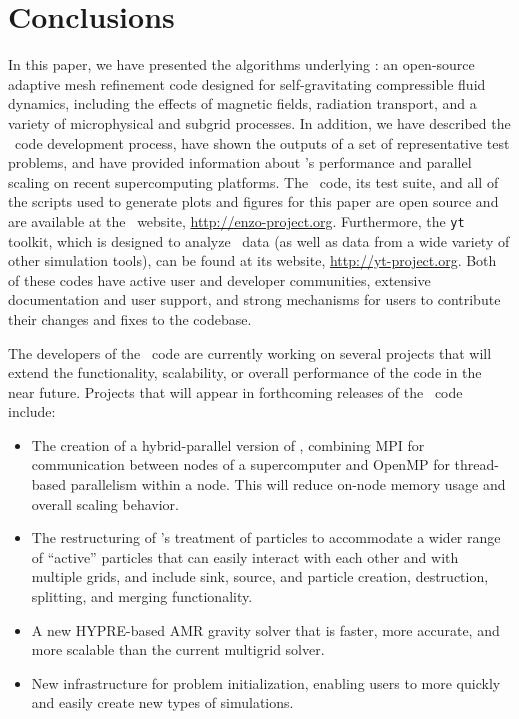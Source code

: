 
\section{Conclusions}
\label{sec.conclusions}

In this paper, we have presented the algorithms underlying \enzo: an
open-source adaptive mesh refinement code designed for
self-gravitating compressible fluid dynamics, including the effects of
magnetic fields, radiation transport, and a variety of microphysical
and subgrid processes.  In addition, we have described the \enzo\ code
development process, have shown the outputs of a set of representative
test problems, and have provided information about \enzo's performance
and parallel scaling on recent supercomputing platforms.  The \enzo\
code, its test suite, and all of the scripts used to generate plots
and figures for this paper are open source and are available at the
\enzo\ website, \url{http://enzo-project.org}.  Furthermore, the \texttt{yt} toolkit,
which is designed to analyze \enzo\ data (as well as data from a wide
variety of other simulation tools), can be found at its website,
\url{http://yt-project.org}.  Both of these codes have active user and
developer communities, extensive documentation and user support, and
strong mechanisms for users to contribute their changes and fixes to
the codebase.

The developers of the \enzo\ code are currently working on several
projects that will extend the functionality, scalability, or overall
performance of the code in the near future.  Projects that will appear
in forthcoming releases of the \enzo\ code include:

\begin{itemize}
\item The creation of a hybrid-parallel version of \enzo, combining
MPI for communication between nodes of a supercomputer and OpenMP for
thread-based parallelism within a node.  This will reduce on-node
memory usage and overall scaling behavior.
\item The restructuring of \enzo's treatment of particles to
accommodate a wider range of ``active'' particles that can easily
interact with each other and with multiple grids, and include sink,
source, and particle creation, destruction, splitting, and merging functionality.
\item A new HYPRE-based AMR gravity solver that is faster, more
accurate, and more scalable than the current multigrid solver.
\item New infrastructure for problem initialization, enabling
  users to more quickly and easily create new types of simulations.
\end{itemize}

